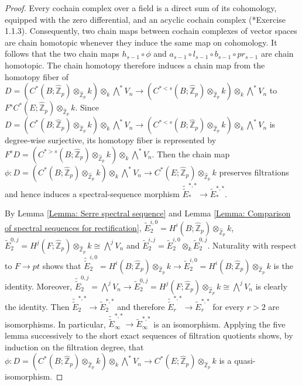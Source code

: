 \documentclass[11pt]{amsart}
\theoremstyle{definition}
\numberwithin{equation}{section}
\numberwithin{equation}{section}
\newcommand\ZZ{\mathbb{Z}}
\begin{document}
\begin{proof}
Every cochain complex over a field is a direct sum of its cohomology, equipped with the zero differential, and an acyclic cochain complex (\cite{Weibel-homological-algebra}*{Exercise 1.1.3}). Consequently, two chain maps between cochain complexes of vector spaces are chain homotopic whenever they induce the same map on cohomology. It follows that the two chain maps $h_{s-1}\circ \phi$ and $a_{s-1} \circ l_{s-1} \circ b_{s-1}\circ pr_{s-1}$ are chain homotopic. The chain homotopy therefore induces a chain map from the homotopy fiber of $D=(C^*(B;\widehat{\ZZ}_p)\otimes_{\widehat{\ZZ}_p} k)\otimes_k \bigwedge^*V_n\rightarrow (C^{*<s}(B;\widehat{\ZZ}_p)\otimes_{\widehat{\ZZ}_p} k)\otimes_k \bigwedge^*V_n$  to $F^s C^*(E;\widehat{\ZZ}_p)\otimes_{\widehat{\ZZ}_p} k$. Since $D=(C^*(B;\widehat{\ZZ}_p)\otimes_{\widehat{\ZZ}_p} k)\otimes_k \bigwedge^*V_n\rightarrow (C^{*<s}(B;\widehat{\ZZ}_p)\otimes_{\widehat{\ZZ}_p} k)\otimes_k \bigwedge^*V_n$ is degree-wise surjective, its homotopy fiber is represented by $F^sD=(C^{*>s}(B;\widehat{\ZZ}_p)\otimes_{\widehat{\ZZ}_p} k)\otimes_k \bigwedge^*V_n$. Then the chain map $\phi:D=(C^*(B;\widehat{\ZZ}_p)\otimes_{\widehat{\ZZ}_p} k)\otimes_k \bigwedge^*V_n\rightarrow C^*(E;\widehat{\ZZ}_p)\otimes_{\widehat{\ZZ}_p} k$ preserves filtrations and hence induces a spectral-sequence morphism $\widetilde{\widetilde{E}}^{*,*}_*\rightarrow \widetilde{E}^{*,*}_*$. 

By Lemma \ref{Lemma: Serre spectral sequence} and Lemma \ref{Lemma: Comparison of spectral sequences for rectification}, $\widetilde{E}^{i,0}_2= H^i(B;\widehat{\ZZ}_p)\otimes_{\widehat{\ZZ}_p}k$, $\widetilde{E}^{0,j}_2= H^j(F;\widehat{\ZZ}_p)\otimes_{\widehat{\ZZ}_p}k\cong \bigwedge^jV_n$ and $\widetilde{E}^{i,j}_2=\widetilde{E}^{i,0}_2\otimes_k \widetilde{E}^{0,j}_2$. Naturality with respect to $F\rightarrow pt$ shows that $\widetilde{\widetilde{E}}^{i,0}_2=H^i(B;\widehat{\ZZ}_p)\otimes_{\widehat{\ZZ}_p}k\rightarrow \widetilde{E}^{i,0}_2=H^i(B;\widehat{\ZZ}_p)\otimes_{\widehat{\ZZ}_p}k$ is the identity. Moreover, $\widetilde{\widetilde{E}}^{0,j}_2=\bigwedge^jV_n\rightarrow \widetilde{E}^{0,j}_2=H^j(F;\widehat{\ZZ}_p)\otimes_{\widehat{\ZZ}_p}k\cong \bigwedge^jV_n$ is clearly the identity. Then $\widetilde{\widetilde{E}}^{*,*}_2\rightarrow \widetilde{E}^{*,*}_2$ and therefore $\widetilde{\widetilde{E}}^{*,*}_r\rightarrow \widetilde{E}^{*,*}_r$ for every $r>2$ are isomorphisms. In particular, $\widetilde{\widetilde{E}}^{*,*}_{\infty}\rightarrow \widetilde{E}^{*,*}_{\infty}$ is an isomorphism. Applying the five lemma successively to the short exact sequences of filtration quotients shows, by induction on the filtration degree, that $\phi:D=(C^*(B;\widehat{\ZZ}_p)\otimes_{\widehat{\ZZ}_p} k)\otimes_k \bigwedge^*V_n\rightarrow C^*(E;\widehat{\ZZ}_p)\otimes_{\widehat{\ZZ}_p} k$ is a quasi-isomorphism.
\end{proof}
\end{document}
